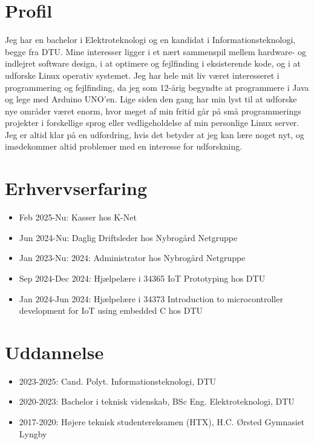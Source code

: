 
\section{Profil}
	Jeg har en bachelor i Elektroteknologi og en kandidat i Informationsteknologi, begge fra DTU.
	Mine interesser ligger i et nært sammenspil mellem hardware- og indlejret software design, i at optimere og fejlfinding i eksisterende kode, og i at udforske Linux operativ systemet.
	Jeg har hele mit liv været interesseret i programmering og fejlfinding, da jeg som 12-årig begyndte at programmere i Java og lege med Arduino UNO'en.
	Lige siden den gang har min lyst til at udforske nye områder været enorm, hvor meget af min fritid går på små programmerings projekter i forskellige sprog eller vedligeholdelse af min personlige Linux server.
	Jeg er altid klar på en udfordring, hvis det betyder at jeg kan lære noget nyt, og imødekommer altid problemer med en interesse for udforskning.

\section{Erhvervserfaring}
	\begin{itemize}
		\item Feb 2025-Nu: Kasser hos K-Net
		\item Jun 2024-Nu: Daglig Driftsleder hos Nybrogård Netgruppe
		\item Jan 2023-Nu: 2024: Administrator hos Nybrogård Netgruppe
		\item Sep 2024-Dec 2024: Hjælpelære i 34365 IoT Prototyping hos DTU
		\item Jan 2024-Jun 2024: Hjælpelære i 34373 Introduction to microcontroller development for IoT using embedded C hos DTU
	\end{itemize}

\section{Uddannelse}
	\begin{itemize}
		\item 2023-2025: Cand. Polyt. Informationsteknologi, DTU
		\item 2020-2023: Bachelor i teknisk videnskab, BSc Eng. Elektroteknologi, DTU
		\item 2017-2020: Højere teknisk studentereksamen (HTX), H.C. Ørsted Gymnasiet Lyngby
	\end{itemize}

